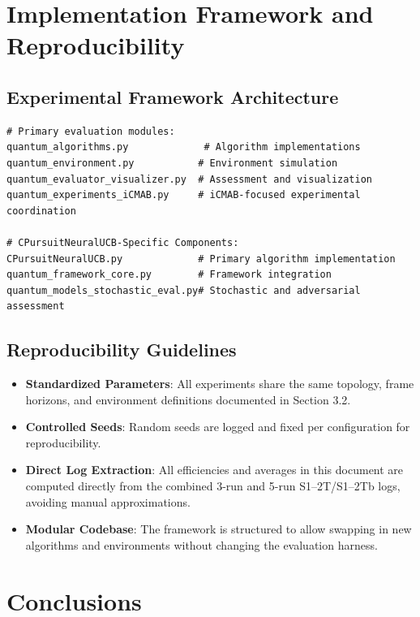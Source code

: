 \documentclass[12pt,a4paper]{article}
\begin{document}
\section{Implementation Framework and Reproducibility}

\subsection{Experimental Framework Architecture}

\begin{lstlisting}[caption=Core Framework Components]
# Primary evaluation modules:
quantum_algorithms.py             # Algorithm implementations
quantum_environment.py           # Environment simulation
quantum_evaluator_visualizer.py  # Assessment and visualization
quantum_experiments_iCMAB.py     # iCMAB-focused experimental coordination

# CPursuitNeuralUCB-Specific Components:
CPursuitNeuralUCB.py             # Primary algorithm implementation
quantum_framework_core.py        # Framework integration
quantum_models_stochastic_eval.py# Stochastic and adversarial assessment
\end{lstlisting}

\subsection{Reproducibility Guidelines}

\begin{itemize}
\item \textbf{Standardized Parameters}: All experiments share the same topology, frame horizons, and environment definitions documented in Section 3.2.
\item \textbf{Controlled Seeds}: Random seeds are logged and fixed per configuration for reproducibility.
\item \textbf{Direct Log Extraction}: All efficiencies and averages in this document are computed directly from the combined 3-run and 5-run S1–2T/S1–2Tb logs, avoiding manual approximations.
\item \textbf{Modular Codebase}: The framework is structured to allow swapping in new algorithms and environments without changing the evaluation harness.
\end{itemize}

\newpage
\section{Conclusions}
\end{document}
